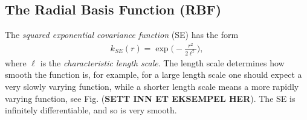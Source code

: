 \documentclass[twoside,english]{uiofysmaster}
\begin{document}
%
%

\subsection{The Radial Basis Function (RBF)}

The \textit{squared exponential covariance function} (SE) has the form 
\begin{align}
k_{SE} (r) = \exp \Big( - \frac{r^2}{2 \ell^2} \Big),
\end{align} 
where $\ell$ is the \textit{characteristic length scale}. The length scale determines how smooth the function is, for example, for a large length scale one should expect a very slowly varying function, while a shorter length scale means a more rapidly varying function, see Fig. (\textbf{SETT INN ET EKSEMPEL HER}). The SE is infinitely differentiable, and so is very smooth. 
\end{document}

